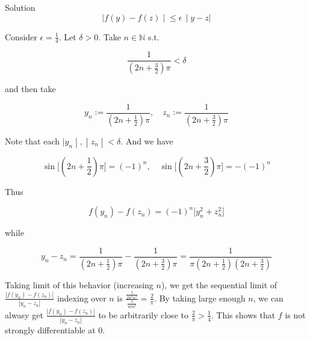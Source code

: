\documentclass{qlnotes-export}
\begin{document}
\begin{qlsolution}{Solution}
\[\left. |f(y) - f(z) \middle| \leq \epsilon\, \middle| y - z| \right.\]

Consider \(\epsilon = \frac{1}{4}\). Let \(\delta > 0\). Take \(n \in {\mathbb{N}}\) s.t.

\[\frac{1}{(2n + \frac{3}{2})\pi} < \delta\]

and then take

\[y_{n} := \frac{1}{\left( {2n + \frac{1}{2}} \right)\pi},\quad z_{n} := \frac{1}{\left( {2n + \frac{3}{2}} \right)\pi}\]

Note that each \(\left. |y_{n} \middle| , \middle| z_{n} \middle| < \delta \right.\). And we have

\[\sin\lbrack(2n + \frac{1}{2})\pi\rbrack = ( - 1)^{n},\quad\sin\lbrack(2n + \frac{3}{2})\pi\rbrack = - ( - 1)^{n}\]

Thus

\[f(y_{n}) - f(z_{n}) = ( - 1)^{n}\lbrack y_{n}^{2} + z_{n}^{2}\rbrack\]

while

\[y_{n} - z_{n} = \frac{1}{\left( {2n + \frac{1}{2}} \right)\pi} - \frac{1}{\left( {2n + \frac{3}{2}} \right)\pi} = \frac{1}{\pi\left( {2n + \frac{1}{2}} \right)\left( {2n + \frac{3}{2}} \right)}\]

Taking limit of this behavior (increasing \(n\)), we get the sequential limit of \(\frac{|f(y_{n}) - f(z_{n})|}{|y_{n} - z_{n}|}\) indexing over \(n\) is \(\frac{\frac{1}{2\pi^{2}n^{2}}}{\frac{1}{4\pi n^{2}}} = \frac{2}{\pi}\). By taking large enough \(n\), we can alwasy get \(\frac{|f(y_{n}) - f(z_{n})|}{|y_{n} - z_{n}|}\) to be arbitrarily close to \(\frac{2}{\pi} > \frac{1}{4}\). This shows that \(f\) is not strongly differentiable at \(0\).

\end{qlsolution}
\end{document}
